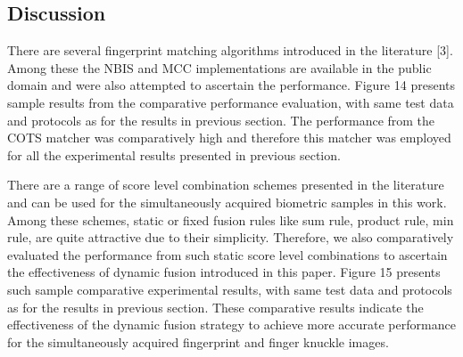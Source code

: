 \subsection{Discussion}

There are several fingerprint matching algorithms introduced in the literature [3]. Among these the NBIS and MCC implementations are available in the public domain and were also attempted to ascertain the performance. Figure 14 presents sample results from the comparative performance evaluation, with same test data and protocols as for the results in previous section.  The performance from the COTS matcher was comparatively high and therefore this matcher was employed for all the experimental results presented in previous section. 

There are a range of score level combination schemes presented in the literature and can be used for the simultaneously acquired biometric samples in this work. Among these schemes, static or fixed fusion rules like sum rule, product rule, min rule, are quite attractive due to their simplicity. Therefore, we also comparatively evaluated the performance from such static score level combinations to ascertain the effectiveness of dynamic fusion introduced in this paper. Figure 15 presents such sample comparative experimental results, with same test data and  protocols  as  for   the results in previous section. These comparative results indicate the effectiveness of the dynamic fusion strategy to achieve more accurate performance for the simultaneously acquired fingerprint and finger knuckle images.

